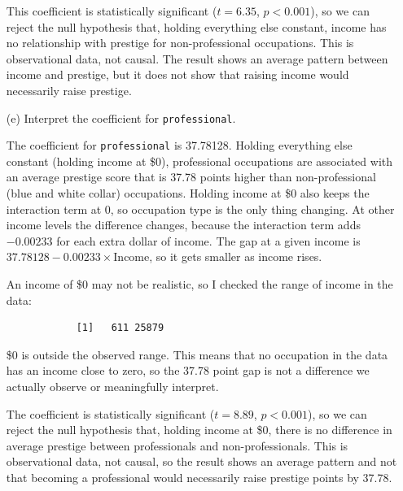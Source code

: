 \documentclass[12pt,letterpaper]{article}
\begin{document}
\begin{enumerate}
		\vspace{.25cm}
		\noindent This coefficient is statistically significant ($t = 6.35$, $p < 0.001$), so we can reject the null hypothesis that, holding everything else constant, income has no relationship with prestige for non-professional occupations. This is observational data, not causal. The result shows an average pattern between income and prestige, but it does not show that raising income would necessarily raise prestige.
		
		\item [(e)]
		Interpret the coefficient for \texttt{professional}.
		\vspace{.25cm}
		
		\noindent The coefficient for \texttt{professional} is 37.78128. Holding everything else constant (holding income at \$0), professional occupations are associated with an average prestige score that is 37.78 points higher than non-professional (blue and white collar) occupations. Holding income at \$0 also keeps the interaction term at 0, so occupation type is the only thing changing. At other income levels the difference changes, because the interaction term adds $-0.00233$ for each extra dollar of income. The gap at a given income is $37.78128 - 0.00233 \times \text{Income}$, so it gets smaller as income rises.
		
		\vspace{.25cm}
		\noindent An income of \$0 may not be realistic, so I checked the range of income in the data:
		
		
		
		\begin{verbatim}
			[1]   611 25879
		\end{verbatim}
		
		\noindent \$0 is outside the observed range. This means that no occupation in the data has an income close to zero, so the 37.78 point gap is not a difference we actually observe or meaningfully interpret. 
		
		\vspace{.25cm}
		\noindent The coefficient is statistically significant ($t = 8.89$, $p < 0.001$), so we can reject the null hypothesis that, holding income at \$0, there is no difference in average prestige between professionals and non-professionals. This is observational data, not causal, so the result shows an average pattern and not that becoming a professional would necessarily raise prestige points by 37.78.
		

\end{enumerate}
\end{document}
